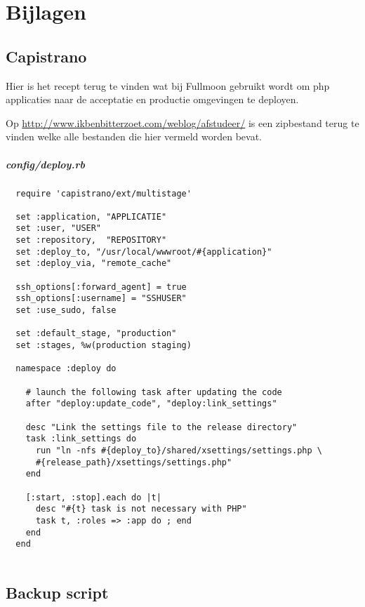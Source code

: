 \chapter{Bijlagen}

\section{Capistrano}

Hier is het recept terug te vinden wat bij Fullmoon gebruikt wordt om php applicaties naar de acceptatie en productie omgevingen te deployen.

Op \href{http://www.ikbenbitterzoet.com/weblog/afstudeer/}{http://www.ikbenbitterzoet.com/weblog/afstudeer/} is een zipbestand terug te vinden welke alle bestanden die hier vermeld worden bevat.

\paragraph{config/deploy.rb}

\begin{verbatim}
  require 'capistrano/ext/multistage'

  set :application, "APPLICATIE"
  set :user, "USER"
  set :repository,  "REPOSITORY"
  set :deploy_to, "/usr/local/wwwroot/#{application}"
  set :deploy_via, "remote_cache"

  ssh_options[:forward_agent] = true
  ssh_options[:username] = "SSHUSER"
  set :use_sudo, false

  set :default_stage, "production"
  set :stages, %w(production staging)

  namespace :deploy do

    # launch the following task after updating the code
    after "deploy:update_code", "deploy:link_settings"

    desc "Link the settings file to the release directory"
    task :link_settings do
      run "ln -nfs #{deploy_to}/shared/xsettings/settings.php \
      #{release_path}/xsettings/settings.php"
    end

    [:start, :stop].each do |t|
      desc "#{t} task is not necessary with PHP"
      task t, :roles => :app do ; end
    end
  end
  
\end{verbatim}

\section{Backup script}

